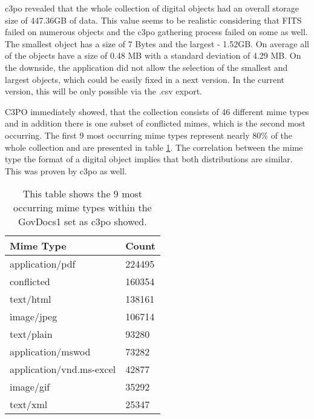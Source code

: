 c3po revealed that the whole collection of digital objects had an overall storage size of 447.36GB of data. This value seems to be realistic considering that FITS failed on numerous objects and the c3po gathering process failed on some as well. The smallest object has a size of 7 Bytes and the largest - 1.52GB. On average all of the objects have a size of 0.48 MB with a standard deviation of 4.29 MB. On the downside, the application did not allow the selection of the smallest and largest objects, which could be easily fixed in a next version. In the current version, this will be only possible via the .csv export.

C3PO immediately showed, that the collection consists of 46 different mime types and in addition there is one subset of conflicted mimes, which is the second most occurring. The first 9 most occurring mime types represent nearly 80\% of the whole collection and are presented in table \ref{tab:govdocs1_mimetypes}. The correlation between the mime type the format of a digital object implies that both distributions are similar. This was proven by c3po as well.


\begin{table}[h]
\centering
\begin{tabular}{l || l }
\hline
Mime Type & Count \\
\hline
\hline
 application/pdf & 224495 \\
 conflicted 	& 160354 \\
 text/html		&  138161 \\
 image/jpeg	&  106714 \\
 text/plain		& 93280 \\
 application/mswod & 73282 \\
 application/vnd.ms-excel & 42877 \\
 image/gif		& 35292 \\
 text/xml		& 25347\\
 \hline
\end{tabular}
\caption{This table shows the 9 most occurring mime types within the GovDocs1 set as c3po showed.}
\label{tab:govdocs1_mimetypes}
\end{table}

